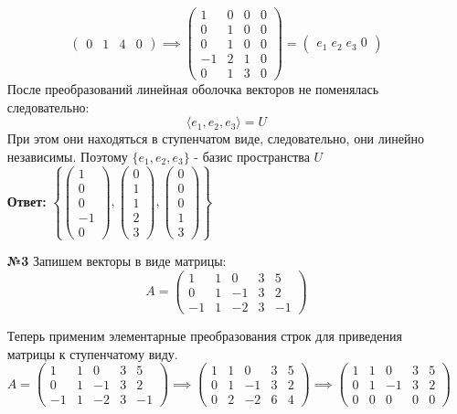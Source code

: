 \documentclass[a4paper]{article}
\newcommand{\mat}[1]{\begin{pmatrix} #1 \end{pmatrix}}
\begin{document}
\begin{enumerate}
$$\begin{pmatrix}
            0 & 1 & 4 & 0
            \end{pmatrix} \implies \begin{pmatrix}
                1 & 0 & 0 & 0 \\
                0 & 1 & 0 & 0 \\
                0 & 1 & 0 & 0 \\
                -1 & 2 & 1 & 0 \\
                0 & 1 & 3 & 0
                \end{pmatrix} = \mat{e_1 \; e_2 \; e_3 \; 0}$$
    После преобразований линейная оболочка векторов не поменялась следовательно:
    $$\langle e_1, e_2, e_3 \rangle = U$$
    При этом они находяться в ступенчатом виде, следовательно, они линейно независимы. Поэтому $\{e_1, e_2, e_3\}$ - базис пространства $U$
    \\\textbf{Ответ: } $\left\{\mat{1 \\ 0 \\ 0 \\ -1\\ 0}, \mat{0 \\ 1\\ 1\\ 2\\3}, \mat{0 \\ 0 \\0 \\ 1 \\ 3} \right\}$\\

    \item[\textbf{№3}]Запишем векторы в виде матрицы:
    $$A = \begin{pmatrix}
        1 & 1 & 0 & 3 & 5 \\
        0 & 1 & -1 & 3 & 2 \\
        -1 & 1 & -2 & 3 & -1
        \end{pmatrix}$$
    
    Теперь применим элементарные преобразования строк для приведения матрицы к ступенчатому виду.
    $$A = \begin{pmatrix}
        1 & 1 & 0 & 3 & 5 \\
        0 & 1 & -1 & 3 & 2 \\
        -1 & 1 & -2 & 3 & -1
        \end{pmatrix} \implies \begin{pmatrix}
            1 & 1 & 0 & 3 & 5 \\
            0 & 1 & -1 & 3 & 2 \\
            0 & 2 & -2 & 6 & 4
            \end{pmatrix}\implies \begin{pmatrix}
                1 & 1 & 0 & 3 & 5 \\
                0 & 1 & -1 & 3 & 2 \\
                0 & 0 & 0 & 0 & 0
                \end{pmatrix}$$
    

\end{enumerate}
\end{document}
